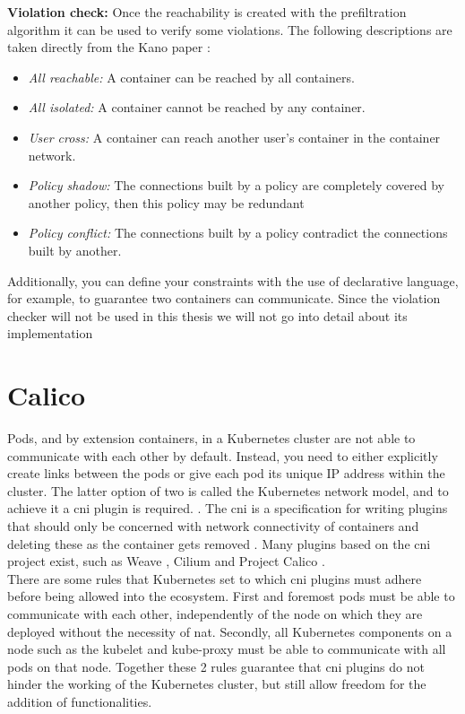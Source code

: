 \textbf{Violation check:} \label{kano:violationcheck} Once the reachability is created with the prefiltration algorithm it can be used to verify some violations. The following descriptions are taken directly from the Kano paper \cite{kano}:
\begin{itemize}
    \renewcommand{\labelitemi}{\scriptsize$\blacksquare$}
    \item \textit{All reachable:} A container can be reached by all containers.
    \item \textit{All isolated:} A container cannot be reached by any container.
    \item \textit{User cross:} A container can reach another user’s container in the container network.
    \item \textit{Policy shadow:} The connections built by a policy are completely covered by another policy, then this policy may be redundant
    \item \textit{Policy conflict:} The connections built by a policy contradict the connections built by another.
\end{itemize}
Additionally, you can define your constraints with the use of declarative language, for example, to guarantee two containers can communicate. Since the violation checker will not be used in this thesis we will not go into detail about its implementation
\\[10pt]


\section{Calico}\label{sec:calico}

Pods, and by extension containers, in a Kubernetes cluster are not able to communicate with each other by default. Instead, you need to either explicitly create links between the pods or give each pod its unique IP address within the cluster. The latter option of two is called the Kubernetes network model, and to achieve it a \acrfull{cni} plugin is required. \cite{k8scni} \cite{k8snetworkmodel}. The \acrshort{cni} is a specification for writing plugins that should only be concerned with network connectivity of containers and deleting these as the container gets removed \cite{cni}. Many plugins based on the \acrshort{cni} project exist, such as Weave \cite{weave}, Cilium \cite{cilium} and Project Calico \cite{calico}.
\\[10pt]

There are some rules that Kubernetes set to which \acrshort{cni} plugins must adhere before being allowed into the ecosystem. First and foremost pods must be able to communicate with each other, independently of the node on which they are deployed without the necessity of \acrfull{nat}. Secondly, all Kubernetes components on a node such as the kubelet and kube-proxy must be able to communicate with all pods on that node. Together these 2 rules guarantee that \acrshort{cni} plugins do not hinder the working of the Kubernetes cluster, but still allow freedom for the addition of functionalities.
\\[10pt]

